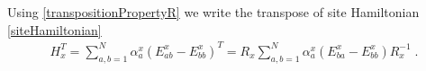 \documentclass[10pt]{article}
\numberwithin{equation}{section}
\numberwithin{equation}{subsection}
\newcommand{\dt}{\;.}
\begin{document}
\begin{comment}
    Indeed, using \eqref{eq:comgl} we have 
    \begin{equation}
[E,E_{Na}]=\sum_{c=1}^{N-1}\left(E_{ca}\delta_{NN}-E_{NN}\delta_{ca}\right)= (\sum_{c=1}^{N-1}E_{ca} ) -E_{NN};
\end{equation}
and 
\begin{equation}
\begin{split}
\left[E,[E,E_{Na}]\right]&=\sum_{d=1}^{N-1}\sum_{c=1}^{N-1}\left[E_{dN},E_{ca}\right]-\sum_{d=1}^{N-1}\left[E_{dN},E_{NN}\right]
\\&=
\sum_{d,c=1}^{N-1}\left(E_{da}\delta_{cN}-E_{cN}\delta_{da}\right)-\sum_{d=1}^{N-1}\left(E_{dN}\delta_{NN}-E_{NN}\delta_{dN}\right)
\\=&
-2\sum_{c=1}^{N-1}E_{cN};
\end{split}
\end{equation}
therefore we have that 
\begin{equation}
	content...
\end{equation}
Inserting the above commutators in \eqref{HadamardFormula}, we obtain \eqref{HT-E1l}.
\item for $A=E_{ba}$ with $a,b \in \{1,\ldots,N-1\}$ we obtain 
\begin{equation}\label{HT-Ekl}
    \exp{(-E)}E_{a b}\exp{(E)}=E_{ba}+E_{bN}
\end{equation}
   Indeed, using \eqref{eq:comgl} we have 
\begin{equation}
[E,E_{ba}]=\sum_{c=1}^{N-1}\left(E_{ca}\delta_{b1}-E_{bN}\delta_{c a}\right)=-E_{bN};
\end{equation}
Inserting the above commutator in \eqref{HadamardFormula}, we obtain \eqref{HT-Ekl}.
\item for $A=E_{NN}$ we obtain 
\begin{equation}\label{HT-E11}
    \exp{(-E)}E_{NN}\exp{(E)}=E_{NN}-\sum_{a=1}^{N-1}E_{aN}
\end{equation}
  Indeed, using \eqref{eq:comgl} we have 

\begin{align*}
[E,E_{NN}]=\sum_{c=1}^{N-1}\left(E_{cN}\delta_{NN}-E_{NN}\delta_{cN}\right)=\sum_{c=1}^{N-1}E_{cN};
\end{align*}
  Inserting the above commutator in \eqref{HadamardFormula}, we obtain \eqref{HT-E11}.
\end{enumerate}
\end{comment}
Using \eqref{transpositionPropertyR} we write the transpose of site Hamiltonian \eqref{siteHamiltonian} 
\begin{equation}
    \begin{split}
H_{x}^{T}=\sum_{a,b=1}^{N}\alpha_{a}^{x}\left(E_{ab}^{x}-E_{bb}^{x}\right)^{T}=R_{x}\sum_{a,b=1}^{N}\alpha_{a}^{x}\left(E_{b a}^{x}-E_{bb}^{x}\right)R_{x}^{-1}\dt
    \end{split}
\end{equation}
\end{document}
